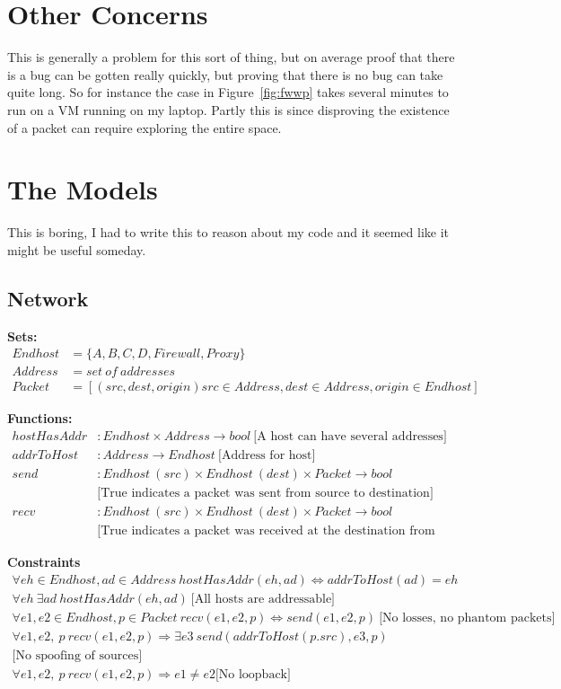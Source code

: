 \documentclass[11pt]{article}
\begin{document}
\section{Other Concerns}
This is generally a problem for this sort of thing, but on average proof that there is a bug can be gotten really
quickly, but proving that there is no bug can take quite long. So for instance the case in Figure~\ref{fig:fwwp} takes
several minutes to run on a VM running on my laptop. Partly this is since disproving the existence of a packet can
require exploring the entire space. 
\section{The Models}
This is boring, I had to write this to reason about my code and it seemed like it might be useful someday.
\subsection{Network}
\textbf{Sets:}
\begin{align*}
Endhost &= \{A, B, C, D, Firewall, Proxy\}\\
Address &= set\ of\ addresses\\
Packet  &= [(src, dest, origin) src\in Address, dest\in Address, origin\in Endhost]
\end{align*}

\textbf{Functions:}
\begin{align*}
hostHasAddr &: Endhost\times Address \rightarrow bool\ \text{[A host can have several addresses]}\\
addrToHost  &: Address \rightarrow Endhost\ \text{[Address for host]}\\
send        &: Endhost\ (src) \times Endhost\ (dest) \times Packet \rightarrow bool\\ &\text{[True indicates a packet was
sent from source to destination]}\\
recv        &: Endhost\ (src) \times Endhost\ (dest) \times Packet \rightarrow bool\\ &\text{[True indicates a packet
was received at the destination from source]}
\end{align*}

\textbf{Constraints}
\begin{gather*}
\forall eh\in Endhost, ad\in Address\ hostHasAddr(eh, ad) \iff addrToHost(ad) = eh\\
\forall eh\ \exists ad\ hostHasAddr(eh, ad)\ \text{[All hosts are addressable]}\\
\forall e1,e2\in Endhost, p\in Packet\ recv(e1,e2,p) \iff send(e1,e2,p)\ \text{[No losses, no phantom packets]}\\
\forall e1,e2,\ p\ recv(e1,e2,p) \Rightarrow \exists e3\ send(addrToHost(p.src), e3, p)\\
\text{[No spoofing of sources]}\\
\forall e1,e2,\ p\ recv(e1,e2,p)\Rightarrow e1 \neq e2\text{[No loopback]}
\end{gather*}
\end{document}
